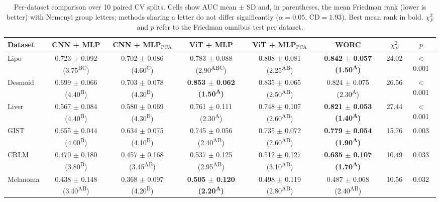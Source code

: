 \begin{table}[t]
\centering
\small
\setlength{\tabcolsep}{4pt}
\begin{tabular}{lccccccc}
\toprule
Dataset & CNN + MLP & CNN + MLP$_\text{PCA}$ & ViT + MLP & ViT + MLP$_\text{PCA}$ & WORC & $\chi^2_F$ & $p$ \\
\midrule
Lipo & 0.723 $\pm$ 0.092 (3.75\textsuperscript{BC}) & 0.702 $\pm$ 0.086 (4.60\textsuperscript{C}) & 0.783 $\pm$ 0.088 (2.90\textsuperscript{ABC}) & 0.808 $\pm$ 0.081 (2.25\textsuperscript{AB}) & \textbf{0.842 $\pm$ 0.057 (1.50\textsuperscript{A})} & 24.02 & $<$0.001 \\
Desmoid & 0.699 $\pm$ 0.066 (4.40\textsuperscript{B}) & 0.703 $\pm$ 0.078 (4.30\textsuperscript{B}) & \textbf{0.853 $\pm$ 0.062 (1.50\textsuperscript{A})} & 0.835 $\pm$ 0.065 (2.50\textsuperscript{AB}) & 0.824 $\pm$ 0.075 (2.30\textsuperscript{A}) & 26.56 & $<$0.001 \\
Liver & 0.567 $\pm$ 0.084 (4.40\textsuperscript{B}) & 0.580 $\pm$ 0.069 (4.30\textsuperscript{B}) & 0.761 $\pm$ 0.111 (2.30\textsuperscript{A}) & 0.748 $\pm$ 0.107 (2.60\textsuperscript{AB}) & \textbf{0.821 $\pm$ 0.053 (1.40\textsuperscript{A})} & 27.44 & $<$0.001 \\
GIST & 0.655 $\pm$ 0.044 (4.00\textsuperscript{B}) & 0.634 $\pm$ 0.075 (4.10\textsuperscript{B}) & 0.745 $\pm$ 0.056 (2.40\textsuperscript{AB}) & 0.735 $\pm$ 0.072 (2.60\textsuperscript{AB}) & \textbf{0.779 $\pm$ 0.054 (1.90\textsuperscript{A})} & 15.76 & 0.003 \\
CRLM & 0.470 $\pm$ 0.180 (3.80\textsuperscript{B}) & 0.457 $\pm$ 0.168 (3.45\textsuperscript{AB}) & 0.537 $\pm$ 0.125 (2.95\textsuperscript{AB}) & 0.512 $\pm$ 0.127 (3.10\textsuperscript{AB}) & \textbf{0.635 $\pm$ 0.107 (1.70\textsuperscript{A})} & 10.49 & 0.033 \\
Melanoma & 0.438 $\pm$ 0.148 (3.40\textsuperscript{AB}) & 0.368 $\pm$ 0.097 (4.20\textsuperscript{B}) & \textbf{0.505 $\pm$ 0.120 (2.20\textsuperscript{A})} & 0.498 $\pm$ 0.119 (2.80\textsuperscript{AB}) & 0.487 $\pm$ 0.068 (2.40\textsuperscript{AB}) & 10.56 & 0.032 \\
\bottomrule
\end{tabular}
\caption{Per-dataset comparison over 10 paired CV splits. Cells show AUC mean $\pm$ SD and, in parentheses, the mean Friedman rank (lower is better) with Nemenyi group letters; methods sharing a letter do not differ significantly ($\alpha=0.05$, CD$=1.93$). Best mean rank in bold. $\chi^2_F$ and $p$ refer to the Friedman omnibus test per dataset.}
\label{tab:mlp_per_dataset_friedman}
\end{table}
